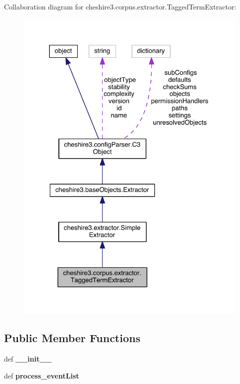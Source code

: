 Collaboration diagram for cheshire3.\-corpus.\-extractor.\-Tagged\-Term\-Extractor\-:
\nopagebreak
\begin{figure}[H]
\begin{center}
\leavevmode
\includegraphics[width=325pt]{classcheshire3_1_1corpus_1_1extractor_1_1_tagged_term_extractor__coll__graph}
\end{center}
\end{figure}
\subsection*{Public Member Functions}
\begin{DoxyCompactItemize}
\item 
\hypertarget{classcheshire3_1_1corpus_1_1extractor_1_1_tagged_term_extractor_ab2a89d79d3c179cb5e3aa5c1dd19ab03}{def {\bfseries \-\_\-\-\_\-init\-\_\-\-\_\-}}\label{classcheshire3_1_1corpus_1_1extractor_1_1_tagged_term_extractor_ab2a89d79d3c179cb5e3aa5c1dd19ab03}

\item 
\hypertarget{classcheshire3_1_1corpus_1_1extractor_1_1_tagged_term_extractor_a19ee5322b24e4cb4aeec5e50cb80374c}{def {\bfseries process\-\_\-event\-List}}\label{classcheshire3_1_1corpus_1_1extractor_1_1_tagged_term_extractor_a19ee5322b24e4cb4aeec5e50cb80374c}

\end{DoxyCompactItemize}
